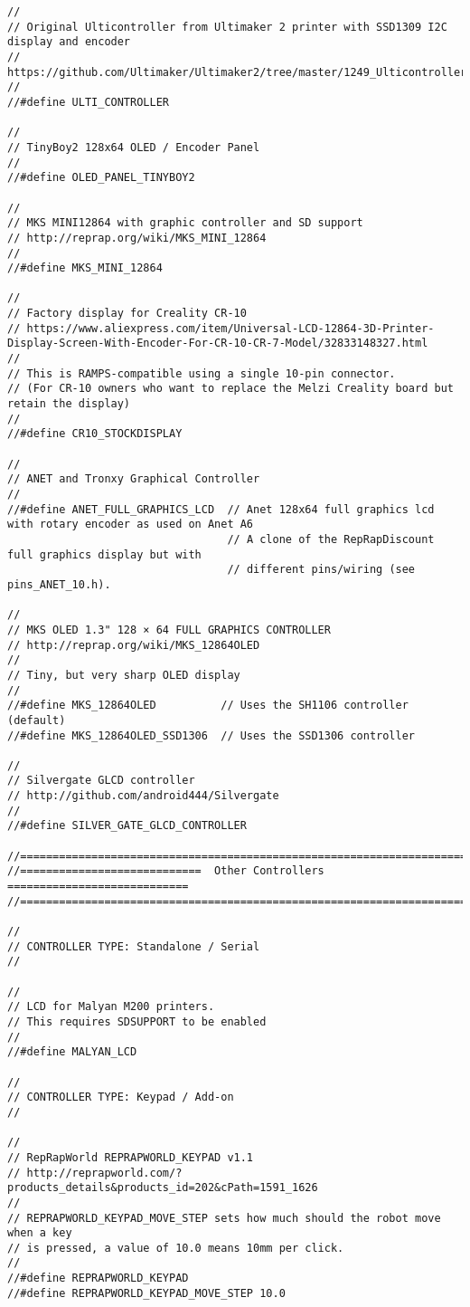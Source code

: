 \begin{lstlisting}[caption = キャプション, label = ラベル]
//
// Original Ulticontroller from Ultimaker 2 printer with SSD1309 I2C display and encoder
// https://github.com/Ultimaker/Ultimaker2/tree/master/1249_Ulticontroller_Board_(x1)
//
//#define ULTI_CONTROLLER

//
// TinyBoy2 128x64 OLED / Encoder Panel
//
//#define OLED_PANEL_TINYBOY2

//
// MKS MINI12864 with graphic controller and SD support
// http://reprap.org/wiki/MKS_MINI_12864
//
//#define MKS_MINI_12864

//
// Factory display for Creality CR-10
// https://www.aliexpress.com/item/Universal-LCD-12864-3D-Printer-Display-Screen-With-Encoder-For-CR-10-CR-7-Model/32833148327.html
//
// This is RAMPS-compatible using a single 10-pin connector.
// (For CR-10 owners who want to replace the Melzi Creality board but retain the display)
//
//#define CR10_STOCKDISPLAY

//
// ANET and Tronxy Graphical Controller
//
//#define ANET_FULL_GRAPHICS_LCD  // Anet 128x64 full graphics lcd with rotary encoder as used on Anet A6
                                  // A clone of the RepRapDiscount full graphics display but with
                                  // different pins/wiring (see pins_ANET_10.h).

//
// MKS OLED 1.3" 128 × 64 FULL GRAPHICS CONTROLLER
// http://reprap.org/wiki/MKS_12864OLED
//
// Tiny, but very sharp OLED display
//
//#define MKS_12864OLED          // Uses the SH1106 controller (default)
//#define MKS_12864OLED_SSD1306  // Uses the SSD1306 controller

//
// Silvergate GLCD controller
// http://github.com/android444/Silvergate
//
//#define SILVER_GATE_GLCD_CONTROLLER

//=============================================================================
//============================  Other Controllers  ============================
//=============================================================================

//
// CONTROLLER TYPE: Standalone / Serial
//

//
// LCD for Malyan M200 printers.
// This requires SDSUPPORT to be enabled
//
//#define MALYAN_LCD

//
// CONTROLLER TYPE: Keypad / Add-on
//

//
// RepRapWorld REPRAPWORLD_KEYPAD v1.1
// http://reprapworld.com/?products_details&products_id=202&cPath=1591_1626
//
// REPRAPWORLD_KEYPAD_MOVE_STEP sets how much should the robot move when a key
// is pressed, a value of 10.0 means 10mm per click.
//
//#define REPRAPWORLD_KEYPAD
//#define REPRAPWORLD_KEYPAD_MOVE_STEP 10.0


\end{lstlisting}

